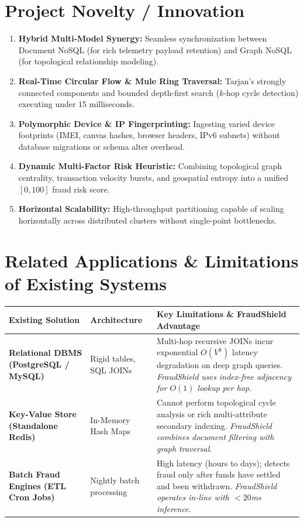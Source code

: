 \documentclass[11pt,a4paper]{article}
\begin{document}
\section{Project Novelty / Innovation}
\begin{enumerate}[leftmargin=1.5em]
    \item \textbf{Hybrid Multi-Model Synergy:} Seamless synchronization between Document NoSQL (for rich telemetry payload retention) and Graph NoSQL (for topological relationship modeling).
    \item \textbf{Real-Time Circular Flow \& Mule Ring Traversal:} Tarjan's strongly connected components and bounded depth-first search ($k$-hop cycle detection) executing under 15 milliseconds.
    \item \textbf{Polymorphic Device \& IP Fingerprinting:} Ingesting varied device footprints (IMEI, canvas hashes, browser headers, IPv6 subnets) without database migrations or schema alter overhead.
    \item \textbf{Dynamic Multi-Factor Risk Heuristic:} Combining topological graph centrality, transaction velocity bursts, and geospatial entropy into a unified $[0, 100]$ fraud risk score.
    \item \textbf{Horizontal Scalability:} High-throughput partitioning capable of scaling horizontally across distributed clusters without single-point bottlenecks.
\end{enumerate}

\section{Related Applications \& Limitations of Existing Systems}
\begin{table}[h!]
\centering
\small
\renewcommand{\arraystretch}{1.3}
\begin{tabularx}{\textwidth}{|p{3.2cm}|p{2.8cm}|X|}
\hline
\textbf{Existing Solution} & \textbf{Architecture} & \textbf{Key Limitations \& FraudShield Advantage} \\ \hline
\textbf{Relational DBMS (PostgreSQL / MySQL)} & Rigid tables, SQL JOINs & Multi-hop recursive JOINs incur exponential $O(V^k)$ latency degradation on deep graph queries. \textit{FraudShield uses index-free adjacency for $O(1)$ lookup per hop.} \\ \hline
\textbf{Key-Value Store (Standalone Redis)} & In-Memory Hash Maps & Cannot perform topological cycle analysis or rich multi-attribute secondary indexing. \textit{FraudShield combines document filtering with graph traversal.} \\ \hline
\textbf{Batch Fraud Engines (ETL Cron Jobs)} & Nightly batch processing & High latency (hours to days); detects fraud only after funds have settled and been withdrawn. \textit{FraudShield operates in-line with $<20$ms inference.} \\ \hline
\end{tabularx}
\end{table}
\end{document}
